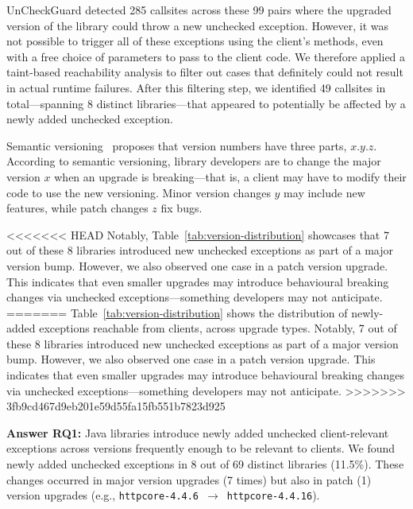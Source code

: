 UnCheckGuard detected 285 callsites across these 99 pairs where the upgraded version of the library could throw a new unchecked exception. However, it was not possible to trigger all of these exceptions using the client's methods, even with a free choice of parameters to pass to the client code. We therefore applied a taint-based reachability analysis to filter out cases that definitely could not result in actual runtime failures. After this filtering step, we identified 49 callsites in total—spanning 8 distinct libraries—that appeared to potentially be affected by a newly added unchecked exception.

Semantic versioning~\cite{preston-werner23:_seman_version} proposes that version numbers have three parts, $x.y.z$. According to semantic versioning, library developers are to change the major version $x$ when an upgrade is breaking---that is, a client may have to modify their code to use the new versioning. Minor version changes $y$ may include new features, while patch changes $z$ fix bugs.

<<<<<<< HEAD
Notably, Table~\ref{tab:version-distribution} showcases that 7 out of these 8 libraries introduced new unchecked exceptions as part of a major version bump. However, we also observed one case in a patch version upgrade. This indicates that even smaller upgrades may introduce behavioural breaking changes via unchecked exceptions—something developers may not anticipate.
=======
Table~\ref{tab:version-distribution} shows the distribution of newly-added exceptions reachable from clients, across upgrade types. Notably, 7 out of these 8 libraries introduced new unchecked exceptions as part of a major version bump. However, we also observed one case in a patch version upgrade. This indicates that even smaller upgrades may introduce behavioural breaking changes via unchecked exceptions—something developers may not anticipate.
>>>>>>> 3fb9cd467d9eb201e59d55fa15fb551b7823d925

\vspace{1em}
\begin{tcolorbox}[colback=gray!10, colframe=black]
\textbf{Answer RQ1:} Java libraries introduce newly added unchecked client-relevant exceptions across versions frequently enough to be relevant to clients. We found newly added unchecked exceptions in 8 out of 69 distinct libraries (11.5\%). These changes occurred in major version upgrades (7 times) but also in patch (1) version upgrades (e.g., \texttt{httpcore-4.4.6}~$\rightarrow$~\texttt{httpcore-4.4.16}).
\end{tcolorbox}
\vspace{1em}

